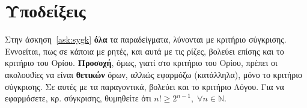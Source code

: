 \documentclass[a4paper,table]{report}
\begin{document}
\begin{enumerate}
  \end{enumerate}

  \section*{Υποδείξεις}

  \begin{myitemize}
    \item Στην άσκηση~\ref{ask:sygk} \textbf{όλα} τα παραδείγματα, λύνονται με 
      κριτήριο σύγκρισης. Εννοείται, πως σε κάποια με ρητές, και αυτά με τις ρίζες, 
      βολεύει επίσης και το κριτήριο του Ορίου.
      \textbf{Προσοχή}, όμως, γιατί στο κριτήριο του Ορίου, πρέπει οι ακολουϑίες να είναι
      \textbf{θετικών} όρων, αλλιώς εφαρμόζω (κατάλληλα), μόνο το κριτήριο σύγκρισης.
      Σε αυτές με τα παραγοντικά, βολεύει και το κριτήριο Λόγου. 
      Για να εφαρμόσετε, κρ. σύγκρισης, θυμηθείτε ότι
      $ n! \geq 2^{n-1}, \; \forall n \in \mathbb{N} $.
  \end{myitemize}

  
\end{document}
